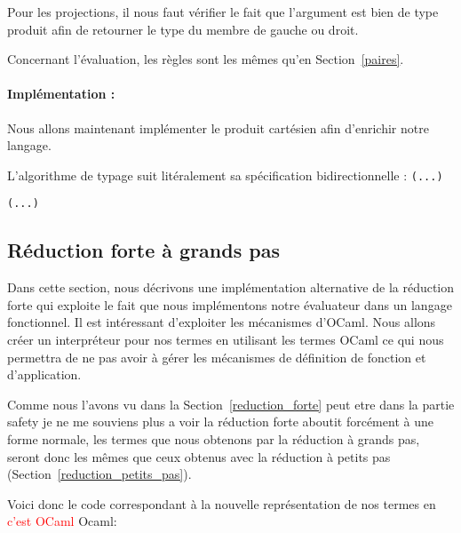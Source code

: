 \documentclass {article}
\newcommand{\codefrom}[3]
           {}
\theoremstyle{definition}
\theoremstyle{remark}
\newcommand{\todo}[1]{\textcolor{red}{#1}}
\begin{document}
Pour les projections, il nous faut vérifier le fait que l'argument est
bien de type produit afin de retourner le type du membre de gauche ou
droit.

Concernant l'évaluation, les règles sont les mêmes qu'en Section~\ref{paires}.

\paragraph{Implémentation :}
Nous allons maintenant implémenter le produit cartésien afin d'enrichir
notre langage. 


L'algorithme de typage suit litéralement sa spécification bidirectionnelle :
%
\codefrom{typed}{lambda}{check_def}\lstinline!(...)!
\codefrom{typed}{lambda}{check_pair}
\codefrom{typed}{lambda}{synth_def}\lstinline!(...)!
\codefrom{typed}{lambda}{synth_pair}



\subsection{Réduction forte à grands pas}
\label{red_forte_grand_pas}

Dans cette section, nous décrivons une implémentation alternative de
la réduction forte qui exploite le fait que nous implémentons notre évaluateur dans un langage fonctionnel.
Il est intéressant d'exploiter les mécanismes d'OCaml. Nous allons créer un interpréteur pour nos termes
en utilisant les termes OCaml ce qui nous permettra de ne pas avoir à 
gérer les mécanismes de définition de fonction et d'application.

Comme nous l'avons vu dans la Section~\ref{reduction_forte}  peut
etre dans la partie safety je ne me souviens plus a voir \fi la
réduction forte aboutit forcément à une forme normale, les termes que
nous obtenons par la réduction à grands pas, seront donc les mêmes que
ceux obtenus avec la réduction à petits pas
(Section~\ref{reduction_petits_pas}).

\newcommand{\VLam}{\lstinline!VLam!}
Voici donc le code correspondant à la nouvelle représentation de nos termes en \todo{c'est OCaml} Ocaml:

\codefrom{typed}{lambda}{value}
\codefrom{typed}{lambda}{neutral}
\end{document}
